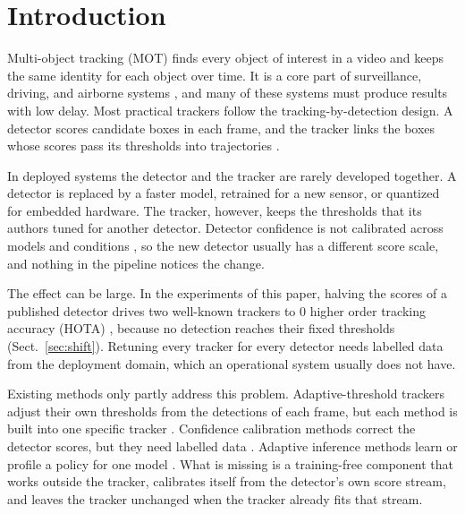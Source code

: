 \section{Introduction}\label{sec:intro}

Multi-object tracking (MOT) finds every object of interest in a video and
keeps the same identity for each object over time. It is a core part of
surveillance, driving, and airborne systems
\cite{zhu2022visdrone,wu2022uavsurvey,lu2024uavdetection}, and many of these systems
must produce results with low delay. Most practical trackers follow the
tracking-by-detection design. A detector scores candidate boxes in each frame,
and the tracker links the boxes whose scores pass its thresholds into
trajectories \cite{bewley2016sort,zhang2022bytetrack,cao2023ocsort}.

In deployed systems the detector and the tracker are rarely developed
together. A detector is replaced by a faster model, retrained for a new
sensor, or quantized for embedded hardware. The tracker, however, keeps the
thresholds that its authors tuned for another detector. Detector confidence is
not calibrated across models and conditions \cite{kuppers2020detcalib}, so the
new detector usually has a different score scale, and nothing in the pipeline
notices the change.

The effect can be large. In the experiments of this paper, halving the scores
of a published detector drives two well-known trackers to 0 higher order
tracking accuracy (HOTA) \cite{luiten2021hota}, because no detection reaches
their fixed thresholds (Sect.~\ref{sec:shift}). Retuning
every tracker for every detector needs labelled data from the deployment
domain, which an operational system usually does not have.

Existing methods only partly address this problem. Adaptive-threshold
trackers adjust their own thresholds from the detections of each frame, but
each method is built into one specific tracker
\cite{ma2023adaptivebytetrack,shim2024adaptrack,act2026adaptive}. Confidence
calibration methods correct the detector scores, but they need labelled data
\cite{kuppers2020detcalib}. Adaptive inference methods learn or profile a
policy for one model \cite{han2022dynamic,jiang2018chameleon}. What is missing
is a training-free component that works outside the tracker, calibrates itself
from the detector's own score stream, and leaves the tracker unchanged when
the tracker already fits that stream.

